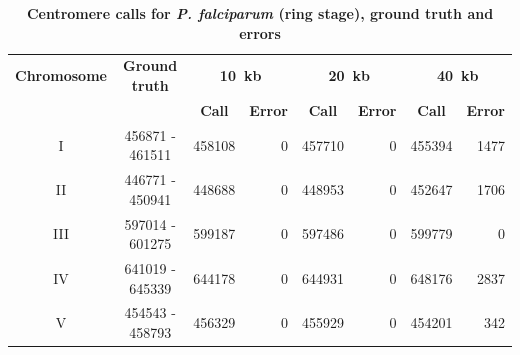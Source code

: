 \begin{table}[ht!]
\caption{\textbf{Centromere calls for \textit{P. falciparum} (ring stage),
ground truth and errors}}
\vspace{10pt}
\begin{center}
\begin{tabular}{c | c  r  r  r  r r r}
\textbf{Chromosome}  & \textbf{Ground truth} & \multicolumn{2}{c}{\textbf{10~kb}} & \multicolumn{2}{c}{\textbf{20~kb}} & \multicolumn{2}{c}{\textbf{40~kb}} \\
  &   &  \multicolumn{1}{c}{\textbf{Call}} &  \multicolumn{1}{c}{\textbf{Error}} &  \multicolumn{1}{c}{\textbf{Call}} &  \multicolumn{1}{c}{\textbf{Error}} &  \multicolumn{1}{c}{\textbf{Call}} &  \multicolumn{1}{c}{\textbf{Error}} \\
\hline
I & \num[group-separator={\,}]{456871} - \num[group-separator={\,}]{461511} & \num[group-separator={\,}]{458108} & \small{\num[group-separator={\,}]{0}}  & \num[group-separator={\,}]{457710} & \small{\num[group-separator={\,}]{0}}  & \num[group-separator={\,}]{455394} & \small{\num[group-separator={\,}]{1477}}  \\
II & \num[group-separator={\,}]{446771} - \num[group-separator={\,}]{450941} & \num[group-separator={\,}]{448688} & \small{\num[group-separator={\,}]{0}}  & \num[group-separator={\,}]{448953} & \small{\num[group-separator={\,}]{0}}  & \num[group-separator={\,}]{452647} & \small{\num[group-separator={\,}]{1706}}  \\
III & \num[group-separator={\,}]{597014} - \num[group-separator={\,}]{601275} & \num[group-separator={\,}]{599187} & \small{\num[group-separator={\,}]{0}}  & \num[group-separator={\,}]{597486} & \small{\num[group-separator={\,}]{0}}  & \num[group-separator={\,}]{599779} & \small{\num[group-separator={\,}]{0}}  \\
IV & \num[group-separator={\,}]{641019} - \num[group-separator={\,}]{645339} & \num[group-separator={\,}]{644178} & \small{\num[group-separator={\,}]{0}}  & \num[group-separator={\,}]{644931} & \small{\num[group-separator={\,}]{0}}  & \num[group-separator={\,}]{648176} & \small{\num[group-separator={\,}]{2837}}  \\
V & \num[group-separator={\,}]{454543} - \num[group-separator={\,}]{458793} & \num[group-separator={\,}]{456329} & \small{\num[group-separator={\,}]{0}}  & \num[group-separator={\,}]{455929} & \small{\num[group-separator={\,}]{0}}  & \num[group-separator={\,}]{454201} & \small{\num[group-separator={\,}]{342}}  \\

\end{tabular}
\end{center}
\end{table}
